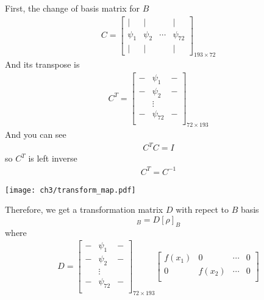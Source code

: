 \begin{definition}
First, the change of basis matrix for $B$
\begin{align*}
        C = 
        \begin{bmatrix}
              \vert & \vert &  & \vert \\
              \psi_1   & \psi_2 & \cdots & \psi_{72} \\
              \vert & \vert &  & \vert
        \end{bmatrix}_{193 \times 72}  
\end{align*}
And its transpose is
\begin{align*}
        C^{T} = 
        \begin{bmatrix}
        - & \psi_1 & - \\
        - & \psi_2 & - \\
         & \vdots & \\
         - & \psi_{72} & - \\
        \end{bmatrix}_{72 \times 193}
\end{align*}
And you can see
\begin{align*}
        C^{T}C = I  
\end{align*}
so \( C^{T}\) is left inverse
\begin{align*}
        C^{T} = C^{-1}  
\end{align*}
\begin{center}
        \texttt{[image: ch3/transform\_map.pdf]}   
\end{center}
Therefore, we get a transformation matrix $D$ with repect to $B$ basis
\begin{equation}
        [T(\rho)]_{B} = D [\rho]_{B}  
\end{equation}
where
\begin{align*}
        D =  \begin{bmatrix}
                - & \psi_1 & - \\
                - & \psi_2 & - \\
                 & \vdots & \\
                 - & \psi_{72} & - \\
             \end{bmatrix}_{72 \times 193}
          \begin{bmatrix} 
          f(x_1) & 0 & \cdots & 0 \\
          0 & f(x_2) & \cdots & 0 \\

\end{bmatrix}
\end{align*}
\end{definition}
